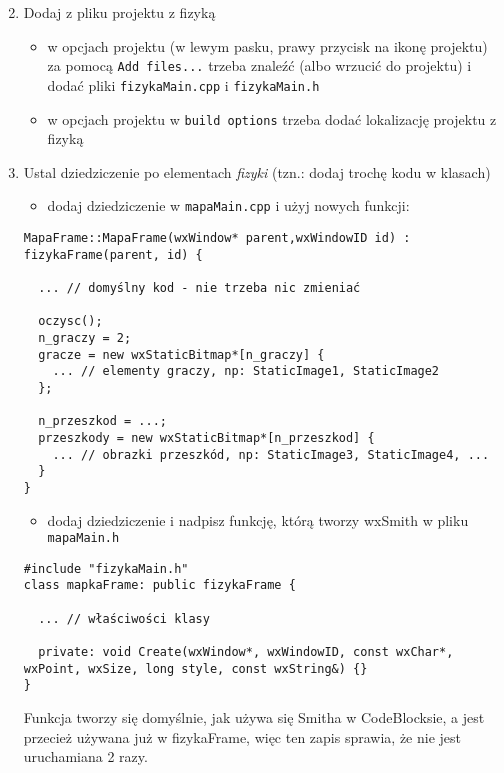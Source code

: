 \documentclass[10pt]{article}
\begin{document}
\begin{enumerate}
  \setcounter{enumi}{1}
  \item Dodaj z pliku projektu z fizyką

  \begin{itemize}
    \item w opcjach projektu (w lewym pasku, prawy przycisk na ikonę projektu) za pomocą \texttt{Add files...} trzeba znaleźć (albo wrzucić do projektu) i dodać pliki \texttt{fizykaMain.cpp} i \texttt{fizykaMain.h}

    \item w opcjach projektu w \texttt{build options} trzeba dodać lokalizację projektu z fizyką

  \end{itemize}

  \item Ustal dziedziczenie po elementach \textit{fizyki} (tzn.: dodaj trochę kodu w klasach)

  \begin{itemize}
    \item dodaj dziedziczenie w \texttt{mapaMain.cpp} i użyj nowych funkcji:
  \end{itemize}\begin{verbatim}
MapaFrame::MapaFrame(wxWindow* parent,wxWindowID id) : fizykaFrame(parent, id) {

  ... // domyślny kod - nie trzeba nic zmieniać

  oczysc();
  n_graczy = 2;
  gracze = new wxStaticBitmap*[n_graczy] {
    ... // elementy graczy, np: StaticImage1, StaticImage2
  };

  n_przeszkod = ...;
  przeszkody = new wxStaticBitmap*[n_przeszkod] {
    ... // obrazki przeszkód, np: StaticImage3, StaticImage4, ...
  }
}
\end{verbatim}


  \begin{itemize}
    \item dodaj dziedziczenie i nadpisz funkcję, którą tworzy wxSmith w pliku \texttt{mapaMain.h}
  \end{itemize}\begin{verbatim}
#include "fizykaMain.h"
class mapkaFrame: public fizykaFrame {

  ... // właściwości klasy

  private: void Create(wxWindow*, wxWindowID, const wxChar*, wxPoint, wxSize, long style, const wxString&) {}
}
\end{verbatim}

Funkcja tworzy się domyślnie, jak używa się Smitha w CodeBlocksie, a jest przecież używana już w fizykaFrame, więc ten zapis sprawia, że nie jest uruchamiana 2 razy.

\end{enumerate}
\end{document}
